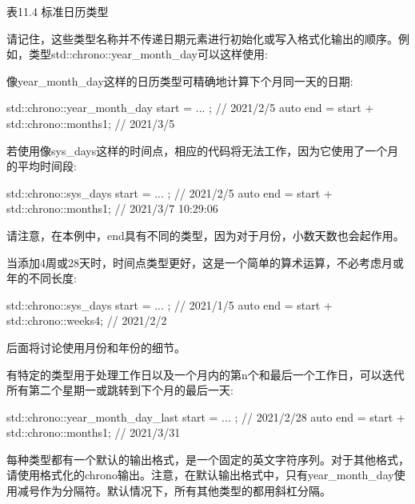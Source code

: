 \begin{center}
表11.4 标准日历类型
\end{center}

请记住，这些类型名称并不传递日期元素进行初始化或写入格式化输出的顺序。例如，类型std::chrono::year\_month\_day可以这样使用:


像year\_month\_day这样的日历类型可精确地计算下个月同一天的日期:

\begin{cpp}
std::chrono::year_month_day start = ... ; // 2021/2/5
auto end = start + std::chrono::months{1}; // 2021/3/5
\end{cpp}

若使用像sys\_days这样的时间点，相应的代码将无法工作，因为它使用了一个月的平均时间段:

\begin{cpp}
std::chrono::sys_days start = ... ; // 2021/2/5
auto end = start + std::chrono::months{1}; // 2021/3/7 10:29:06
\end{cpp}

请注意，在本例中，end具有不同的类型，因为对于月份，小数天数也会起作用。

当添加4周或28天时，时间点类型更好，这是一个简单的算术运算，不必考虑月或年的不同长度:

\begin{cpp}
std::chrono::sys_days start = ... ; // 2021/1/5
auto end = start + std::chrono::weeks{4}; // 2021/2/2
\end{cpp}

后面将讨论使用月份和年份的细节。

有特定的类型用于处理工作日以及一个月内的第n个和最后一个工作日，可以迭代所有第二个星期一或跳转到下个月的最后一天:

\begin{cpp}
std::chrono::year_month_day_last start = ... ; // 2021/2/28
auto end = start + std::chrono::months{1}; // 2021/3/31
\end{cpp}

每种类型都有一个默认的输出格式，是一个固定的英文字符序列。对于其他格式，请使用格式化的chrono输出。注意，在默认输出格式中，只有year\_month\_day使用减号作为分隔符。默认情况下，所有其他类型的都用斜杠分隔。

